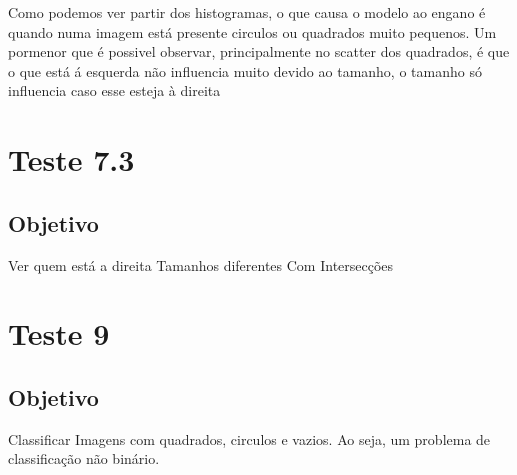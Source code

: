 Como podemos ver partir dos histogramas, o que causa o modelo ao engano é quando numa imagem está presente circulos ou quadrados muito pequenos. Um pormenor que é possivel observar, principalmente no scatter dos quadrados, é que o que está á esquerda não influencia muito devido ao tamanho, o tamanho só influencia caso esse esteja à direita


\section{Teste 7.3}
\subsection{Objetivo}
    Ver quem está a direita
    Tamanhos diferentes
    Com Intersecções

 	    
 

\section{Teste 9}
\subsection{Objetivo}
    Classificar Imagens com quadrados, circulos e vazios. Ao seja, um problema de classificação não binário.
